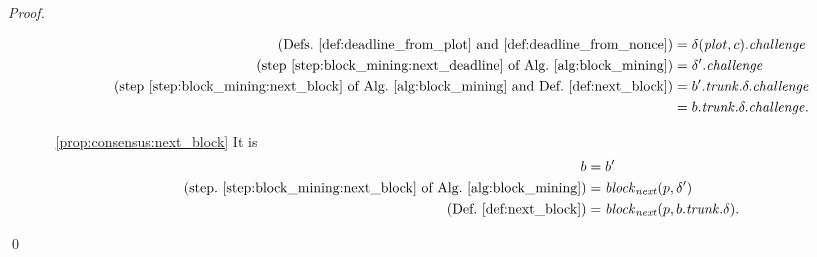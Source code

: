 \begin{proof}
\begin{itemize}
\begin{itemize}
\begin{align*}
        \text{(Defs.~\ref{def:deadline_from_plot} and~\ref{def:deadline_from_nonce})}&=
        \delta({\mathit{plot}},c).{\mathit{challenge}}\\
        \text{(step~\ref{step:block_mining:next_deadline} of Alg.~\ref{alg:block_mining})}&=\delta'.{\mathit{challenge}}\\
        \text{(step~\ref{step:block_mining:next_block} of Alg.~\ref{alg:block_mining} and Def.~\ref{def:next_block})}&=b'.{\mathit{trunk}}.\delta.{\mathit{challenge}}\\
        &=b.{\mathit{trunk}}.\delta.{\mathit{challenge}}.
      \end{align*}
    \item[\ref{prop:consensus:next_block}] It is
      \begin{align*}
        b&=b'\\
        \text{(step.~\ref{step:block_mining:next_block} of Alg.~\ref{alg:block_mining})}
        &={\mathit{block}}_{\mathit{next}}(p,\delta')\\
        \text{(Def.~\ref{def:next_block})}&={\mathit{block}}_{\mathit{next}}(p,b.{\mathit{trunk}}.\delta).
      \end{align*}
    \end{itemize}
  \end{itemize}
  \qed
\end{proof}
